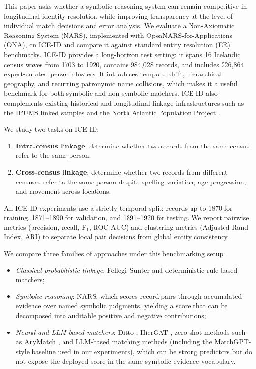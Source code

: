 \documentclass{article}
\begin{document}
This paper asks whether a symbolic reasoning system can remain competitive in longitudinal identity resolution while improving transparency at the level of individual match decisions and error analysis. We evaluate a Non-Axiomatic Reasoning System (NARS), implemented with OpenNARS-for-Applications (ONA), on ICE-ID and compare it against standard entity resolution (ER) benchmarks. ICE-ID provides a long-horizon test setting: it spans 16 Icelandic census waves from 1703 to 1920, contains 984,028 records, and includes 226,864 expert-curated person clusters. It introduces temporal drift, hierarchical geography, and recurring patronymic name collisions, which makes it a useful benchmark for both symbolic and non-symbolic matchers. ICE-ID also complements existing historical and longitudinal linkage infrastructures such as the IPUMS linked samples \cite{ipums_lrs, ipums_mlp} and the North Atlantic Population Project \cite{ipums_napp, sobek2011big}.

We study two tasks on ICE-ID:
\begin{enumerate}
  \item \textbf{Intra-census linkage}: determine whether two records from the same census refer to the same person.
  \item \textbf{Cross-census linkage}: determine whether two records from different censuses refer to the same person despite spelling variation, age progression, and movement across locations.
\end{enumerate}

All ICE-ID experiments use a strictly temporal split: records up to 1870 for training, 1871--1890 for validation, and 1891--1920 for testing. We report pairwise metrics (precision, recall, F$_1$, ROC-AUC) and clustering metrics (Adjusted Rand Index, ARI) to separate local pair decisions from global entity consistency.

We compare three families of approaches under this benchmarking setup:
\begin{itemize}
  \item \emph{Classical probabilistic linkage}: Fellegi--Sunter and deterministic rule-based matchers;
  \item \emph{Symbolic reasoning}: NARS, which scores record pairs through accumulated evidence over named symbolic judgments, yielding a score that can be decomposed into auditable positive and negative contributions;
  \item \emph{Neural and LLM-based matchers}: Ditto \cite{Li2020DeepEM}, HierGAT \cite{yao2022hiergat}, zero-shot methods such as AnyMatch \cite{zhang2024anymatch}, and LLM-based matching methods (including the MatchGPT-style baseline used in our experiments), which can be strong predictors but do not expose the deployed score in the same symbolic evidence vocabulary.
\end{itemize}
\end{document}

